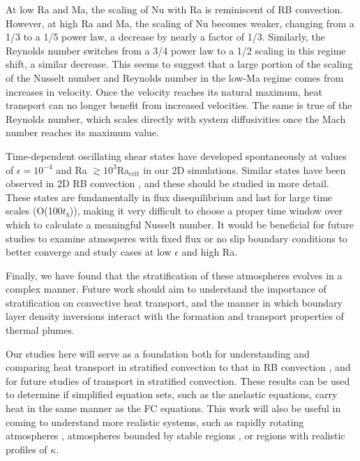 \documentclass[aps, prl, twocolumn, nofootinbib, groupedaddress, amsfonts, amssymb, amsmath]{revtex4-1}
\begin{document}
At low Ra and Ma, the scaling of Nu with Ra is reminiscent of RB convection.  
However, at high Ra and Ma, the scaling of Nu becomes weaker, changing
from a 1/3 to a 1/5 power law, a decrease by nearly a factor of 1/3.
Similarly, the Reynolds number switches from a 3/4 power law to
a 1/2 scaling in this regime shift, a similar decrease.
This seems to suggest that a large portion of the scaling of the Nusselt number
and Reynolds number in the low-Ma regime
comes from increases in velocity.  Once the velocity reaches
its natural maximum, heat transport can no longer benefit from increased velocities.
The same is true of the Reynolds number, which scales directly with system diffusivities
once the Mach number reaches its maximum value.

Time-dependent oscillating shear states have developed spontaneously
at values of $\epsilon=10^{-4}$ and Ra $\gtrsim 10^3$Ra$_{\text{crit}}$ in our 2D simulations.  
Similar states have been observed in 2D RB convection \cite{goluskin&all2014}, and these should
be studied in more detail.  These states are fundamentally in flux disequilibrium
and last for large time scales (O(100$t_b$)),
making it very difficult to choose a proper time window over which to calculate a 
meaningful Nusselt number.  It would
be beneficial for future studies to examine atmosperes with fixed flux or no slip
boundary conditions to better converge and study cases at low $\epsilon$ and high
Ra.

Finally, we have found that the stratification of 
these atmospheres evolves in a complex
manner.  Future work should aim to 
understand the importance of stratification on
convective heat transport, and the manner in which
boundary layer density inversions interact with
the formation and transport properties of thermal plumes.

Our studies
here will serve as a foundation both for understanding and 
comparing heat transport in stratified convection
to that in RB convection \cite{johnston&doering2009}, 
and for future studies of transport in stratified convection.  
These results can be used to determine if simplified equation sets, 
such as the anelastic equations, carry heat in the same manner as the 
FC equations.
This work will also be useful in coming to understand more realistic systems, 
such as rapidly rotating atmospheres \cite{julien&all2012},
atmospheres bounded by stable regions \cite{hurlburt&all1986}, 
or regions with realistic profiles of $\kappa$.
\end{document}
